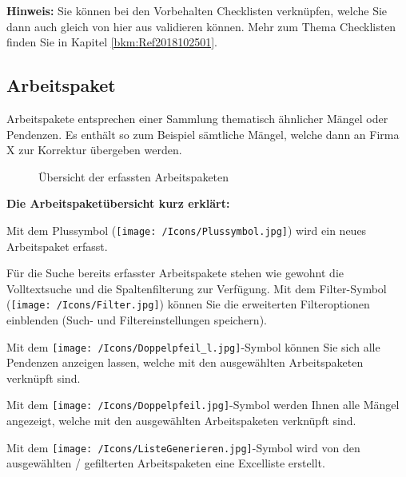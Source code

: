 \vspace{\baselineskip}

\textbf{Hinweis:} Sie können bei den Vorbehalten Checklisten verknüpfen, welche Sie dann auch gleich von hier aus validieren können. Mehr zum Thema Checklisten finden Sie in Kapitel \ref{bkm:Ref2018102501}.

\pagebreak
\subsection{Arbeitspaket}

Arbeitspakete entsprechen einer Sammlung thematisch ähnlicher Mängel oder Pendenzen. Es enthält so zum Beispiel sämtliche Mängel, welche dann an Firma X zur Korrektur übergeben werden.

\begin{figure}[H]
\caption{Übersicht der erfassten Arbeitspaketen}
\end{figure}

\textbf{Die Arbeitspaketübersicht kurz erklärt:}

\vspace{\baselineskip}

\begin{compactitem}
	\item Mit dem Plussymbol (\texttt{[image: /Icons/Plussymbol.jpg]}) wird ein neues Arbeitspaket erfasst. 
	\item Für die Suche bereits erfasster Arbeitspakete stehen wie gewohnt die Volltextsuche und die Spaltenfilterung zur Verfügung. Mit dem Filter-Symbol (\texttt{[image: /Icons/Filter.jpg]}) können Sie die erweiterten Filteroptionen einblenden (Such- und Filtereinstellungen speichern).
	\item Mit dem \texttt{[image: /Icons/Doppelpfeil\_l.jpg]}-Symbol können Sie sich alle Pendenzen anzeigen lassen, welche mit den ausgewählten Arbeitspaketen verknüpft sind.
	\item Mit dem \texttt{[image: /Icons/Doppelpfeil.jpg]}-Symbol werden Ihnen alle Mängel angezeigt, welche mit den ausgewählten Arbeitspaketen verknüpft sind.
	\item Mit dem \texttt{[image: /Icons/ListeGenerieren.jpg]}-Symbol wird von den ausgewählten / gefilterten Arbeitspaketen eine Excelliste erstellt.
\end{compactitem}

